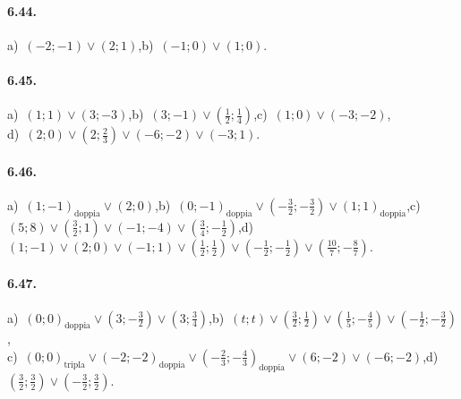 \paragraph{6.44.} a)~$(-2;-1)\vee(2;1)$,\quad b)~$(-1;0)\vee(1;0)$.

\paragraph{6.45.} a)~$(1;1)\vee(3;-3)$,\quad b)~$(3;-1)\vee\left(\frac 1 2;\frac 1 4\right)$,\quad c)~$(1;0)\vee(-3;-2)$,\protect\\
\quad d)~$(2;0)\vee\left(2;\frac 2 3\right)\vee(-6;-2)\vee(-3;1)$.

\paragraph{6.46.} a)~$(1;-1)_\text{doppia} \vee(2;0)$,\quad b)~$(0;-1)_\text{doppia}\vee\left(-\frac 3 2;-\frac 3 2\right)\vee(1;1)_\text{doppia}$,\quad c)~$(5;8)\vee\left(\frac 3 2;1\right)\vee(-1;-4)\vee\left(\frac 3 4;-\frac 1 2\right)$,\quad d)~$(1;-1)\vee(2;0)\vee(-1;1)\vee\left(\frac 1 2;\frac 1 2\right)\vee\left(-\frac 1 2;-\frac 1 2\right)\vee\left(\frac{10} 7;-\frac 8 7\right)$.

\paragraph{6.47.}a)~$(0;0)_\text{doppia}\vee\left(3;-\frac 3 2\right)\vee(3;\frac 3 4)$,\quad b)~$(t;t)\vee\left(\frac 3 2;\frac 1 2\right)\vee\left(\frac 1 5;-\frac 4 5\right)\vee\left(-\frac 1 2;-\frac 3 2\right)$,\protect\\
\quad c)~$(0;0)_\text{tripla}\vee(-2;-2)_\text{doppia}\vee\left(-\frac 2 3;-\frac 4 3\right)_\text{doppia}\vee(6;-2)\vee(-6;-2)$,\quad d)~$\left(\frac 3 2;\frac 3 2\right)\vee\left(-\frac 3 2;\frac 3 2\right)$.

